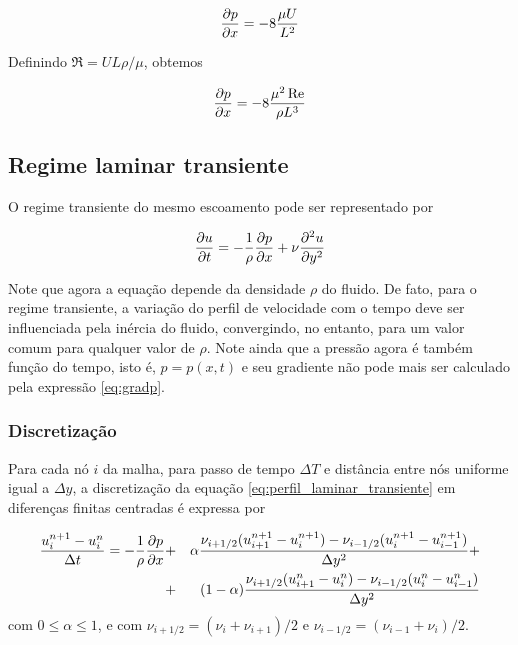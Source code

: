 \begin{equation}
  \frac{\partial p}{\partial x}=-8\frac{\mu U}{L^2}
\end{equation}

Definindo $\Re=UL\rho/\mu$, obtemos

\begin{equation}
  \frac{\partial p}{\partial x}=-8\frac{\mu^2\operatorname{Re}}{\rho L^3}
  \label{eq:gradp}
\end{equation}

\subsection{Regime laminar transiente}

O regime transiente do mesmo escoamento pode ser representado por

\begin{equation}
    \frac{\partial u}{\partial t}=-\frac{1}{\rho}\frac{\partial p}{\partial x}+\nu\frac{\partial^2u}{\partial y^2}
    \label{eq:perfil_laminar_transiente}
\end{equation}

Note que agora a equação depende da densidade $\rho$ do fluido. De fato, para o regime transiente, a variação do perfil de velocidade com o tempo deve ser influenciada pela inércia do fluido, convergindo, no entanto, para um valor comum para qualquer valor de $\rho$. Note ainda que a pressão agora é também função do tempo, isto é, $p = p(x,t)$ e seu gradiente não pode mais ser calculado pela expressão \ref{eq:gradp}.

\subsubsection{Discretização}

Para cada nó $i$ da malha, para passo de tempo $\Delta T$ e distância entre nós uniforme igual a $\Delta y$, a discretização da equação \ref{eq:perfil_laminar_transiente} em diferenças finitas centradas é expressa por

\begin{eqnarray}
  \frac{u_i^{n+1}-u_i^n}{\Delta t} = -\frac{1}{\rho}\frac{\partial p}{\partial x} &+& \alpha\frac{\nu_{i+1/2}(u_{i+1}^{n+1}-u_{i}^{n+1})-\nu_{i-1/2}(u_{i}^{n+1}-u_{i-1}^{n+1})}{\Delta y^2}+\nonumber\\ &+& (1-\alpha)\frac{\nu_{i+1/2}(u_{i+1}^n-u_{i}^n)-\nu_{i-1/2}(u_{i}^n-u_{i-1}^n)}{\Delta y^2}
  \label{eq:perfil_laminar_discr}
\end{eqnarray}
com $0\leq\alpha\leq 1$, e com $\nu_{i+1/2} = (\nu_{i}+\nu_{i+1})/2$ e $\nu_{i-1/2} = (\nu_{i-1}+\nu_{i})/2$.

